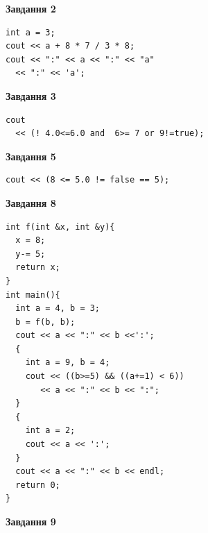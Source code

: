 \documentclass[12pt, ukrainian]{article}
\begin{document}
{\begin {large}
\begin{minipage}[t]{7.0cm}
\end{minipage}
\vline \hspace{1mm}
\begin{minipage}[t]{11.0cm}

\begin{center}
\textbf{Завдання 2}
\end{center}
\vspace{-8mm}

\begin{verbatim}
int a = 3;
cout << a + 8 * 7 / 3 * 8;
cout << ":" << a << ":" << "a" 
  << ":" << 'a';
\end{verbatim}



\begin{center}
\textbf{Завдання 3}
\end{center}
\vspace{-8mm}

\begin{verbatim}
cout 
  << (! 4.0<=6.0 and  6>= 7 or 9!=true);
\end{verbatim}



\begin{center}
\textbf{Завдання 5}
\end{center}
\vspace{-8mm}

\begin{verbatim}
cout << (8 <= 5.0 != false == 5);
\end{verbatim}



\begin{center}
\textbf{Завдання 8}
\end{center}
\vspace{-8mm}

\begin{verbatim}
int f(int &x, int &y){
  x = 8;
  y-= 5;
  return x;
}
int main(){
  int a = 4, b = 3;
  b = f(b, b);
  cout << a << ":" << b <<':';
  {
    int a = 9, b = 4;
    cout << ((b>=5) && ((a+=1) < 6))
       << a << ":" << b << ":";
  }
  {
    int a = 2;
    cout << a << ':';
  }
  cout << a << ":" << b << endl;
  return 0;
}
\end{verbatim}

\end{minipage}


\begin{minipage}[t]{7.0cm}

\begin{center}
\textbf{Завдання 9}
\end{center}
\vspace{-8mm}


\end{minipage}
\end{large}}
\end{document}
